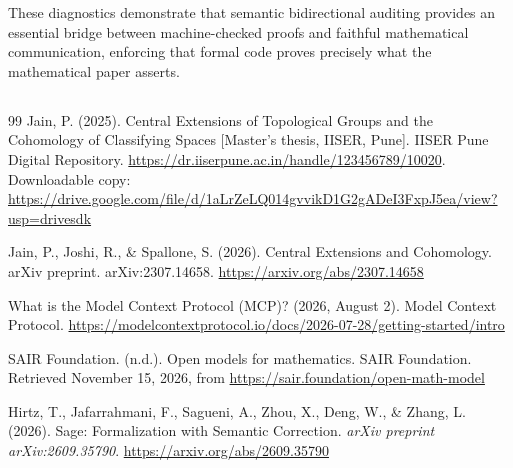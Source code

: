 \documentclass[12 pt]{article}
\theoremstyle{definition}
\begin{document}
These diagnostics demonstrate that semantic bidirectional auditing provides an essential bridge between machine-checked proofs and faithful mathematical communication, enforcing that formal code proves precisely what the mathematical paper asserts.

\subsection{}

\begin{thebibliography}{99}
 Jain, P. (2025). Central Extensions of Topological Groups and the Cohomology of Classifying Spaces [Master's thesis, IISER, Pune]. IISER Pune Digital Repository. \url{https://dr.iiserpune.ac.in/handle/123456789/10020}. Downloadable copy: \url{https://drive.google.com/file/d/1aLrZeLQ014gvvikD1G2gADeI3FxpJ5ea/view?usp=drivesdk}

 Jain, P., Joshi, R., \& Spallone, S. (2026). Central Extensions and Cohomology. arXiv preprint. arXiv:2307.14658. \url{https://arxiv.org/abs/2307.14658}


 What is the Model Context Protocol (MCP)? (2026, August 2). Model Context Protocol. \url{https://modelcontextprotocol.io/docs/2026-07-28/getting-started/intro}

 SAIR Foundation. (n.d.). Open models for mathematics. SAIR Foundation. Retrieved November 15, 2026, from \url{https://sair.foundation/open-math-model}

 Hirtz, T., Jafarrahmani, F., Sagueni, A., Zhou, X., Deng, W., \& Zhang, L. (2026). Sage: Formalization with Semantic Correction. \emph{arXiv preprint arXiv:2609.35790}. \url{https://arxiv.org/abs/2609.35790}







\end{thebibliography}
\end{document}
